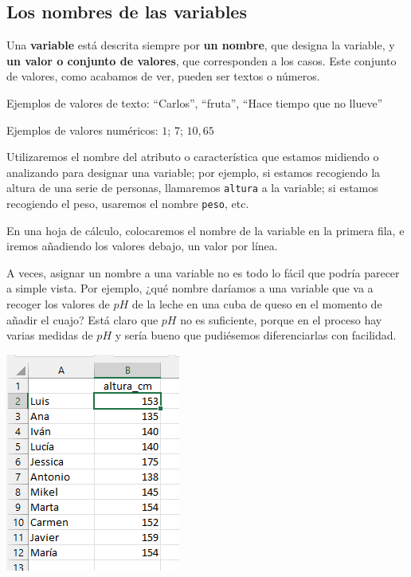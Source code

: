 \documentclass[
  letterpaper,
]{scrbook}
\begin{document}
\hypertarget{los-nombres-de-las-variables}{%
\subsection{Los nombres de las
variables}\label{los-nombres-de-las-variables}}

Una \textbf{variable} está descrita siempre por \textbf{un nombre}, que
designa la variable, y \textbf{un valor o conjunto de valores}, que
corresponden a los casos. Este conjunto de valores, como acabamos de
ver, pueden ser textos o números.

{}

Ejemplos de valores de texto: ``Carlos'', ``fruta'', ``Hace tiempo que
no llueve''

Ejemplos de valores numéricos: \(1\); \(7\); \(10,65\)

Utilizaremos el nombre del atributo o característica que estamos
midiendo o analizando para designar una variable; por ejemplo, si
estamos recogiendo la altura de una serie de personas, llamaremos
\texttt{altura} a la variable; si estamos recogiendo el peso, usaremos
el nombre \texttt{peso}, etc.

En una hoja de cálculo, colocaremos el nombre de la variable en la
primera fila, e iremos añadiendo los valores debajo, un valor por línea.

A veces, asignar un nombre a una variable no es todo lo fácil que podría
parecer a simple vista. Por ejemplo, ¿qué nombre daríamos a una variable
que va a recoger los valores de \(pH\) de la leche en una cuba de queso
en el momento de añadir el cuajo? Está claro que \(pH\) no es
suficiente, porque en el proceso hay varias medidas de \(pH\) y sería
bueno que pudiésemos diferenciarlas con facilidad.

\begin{marginfigure}

{\centering \includegraphics{./01-imagenes/aula1.png}

}

\end{marginfigure}
\end{document}
